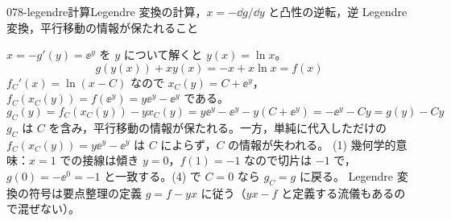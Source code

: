 \documentclass[uplatex,dvipdfmx,a4paper,11pt]{jsarticle}
\begin{document}
\begin{mondai}{078-legendre}{計算}{Legendre 変換の計算，$x = -\dd g/\dd y$ と凸性の逆転，逆 Legendre 変換，平行移動の情報が保たれること}
\begin{tadashii}
 $x = -g'(y) = \ee^{y}$ を $y$ について解くと $y(x) = \ln x$。
\[ g(y(x)) + xy(x) = -x + x\ln x = f(x) \]
 $f_{C}'(x) = \ln(x - C)$ なので $x_{C}(y) = C + \ee^{y}$，$f_{C}(x_{C}(y)) = f(\ee^{y}) = y\ee^{y} - \ee^{y}$ である。
\[ g_{C}(y) = f_{C}(x_{C}(y)) - yx_{C}(y) = y\ee^{y} - \ee^{y} - y(C + \ee^{y}) = -\ee^{y} - Cy = g(y) - Cy \]
$g_{C}$ は $C$ を含み，平行移動の情報が保たれる。一方，単純に代入しただけの $f_{C}(x_{C}(y)) = y\ee^{y} - \ee^{y}$ は $C$ によらず，$C$ の情報が失われる。
\kenzan (1) 幾何学的意味：$x = 1$ での接線は傾き $y = 0$，$f(1) = -1$ なので切片は $-1$ で，$g(0) = -\ee^{0} = -1$ と一致する。(4) で $C = 0$ なら $g_{C} = g$ に戻る。
\tsumazuki Legendre 変換の符号は要点整理の定義 $g = f - yx$ に従う（$yx - f$ と定義する流儀もあるので混ぜない）。
\end{tadashii}
\end{mondai}
\end{document}
